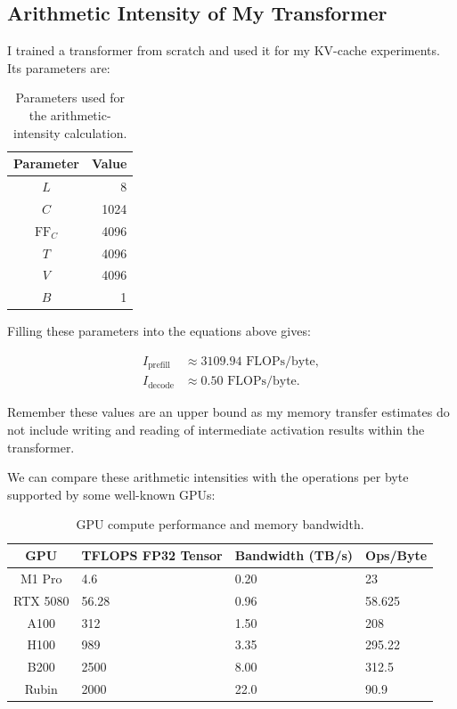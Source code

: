 \documentclass{article}
\begin{document}
\subsection{Arithmetic Intensity of My Transformer}

I trained a transformer from scratch and used it for my KV-cache experiments. Its parameters are:

\begin{table}[ht]
\centering
\begin{tabular}{|c|r|}
    \hline
    Parameter & Value \\
    \hline
    $L$ & 8 \\
    $C$ & 1024 \\
    $\mathrm{FF}_C$ & 4096 \\
    $T$ & 4096 \\
    $V$ & 4096 \\
    $B$ & 1 \\
    \hline
\end{tabular}
\caption{Parameters used for the arithmetic-intensity calculation.}
\label{tab:model-parameters}
\end{table}

Filling these parameters into the equations above gives:

\begin{align}
I_{\mathrm{prefill}} &\approx 3109.94 \text{ FLOPs/byte}, \\
I_{\mathrm{decode}}  &\approx 0.50 \text{ FLOPs/byte}.
\end{align}

Remember these values are an upper bound as my memory transfer estimates do not include writing and reading of intermediate activation results within the transformer.

We can compare these arithmetic intensities with the operations per byte supported by some well-known GPUs:

\begin{table}[ht]
\centering
\begin{tabular}{|c|l|l|l|}
   \hline
   GPU & TFLOPS FP32 Tensor & Bandwidth (TB/s) &
Ops/Byte \\
   \hline
   M1 Pro   & 4.6   & 0.20 & 23 \\
   RTX 5080 & 56.28 & 0.96 & 58.625 \\
   A100     & 312   & 1.50 & 208 \\
   H100     & 989   & 3.35 & 295.22 \\
   B200     & 2500  & 8.00 & 312.5 \\
   Rubin    & 2000  & 22.0 & 90.9 \\
   \hline
\end{tabular}
\caption{GPU compute performance and memory bandwidth.}
\label{tab:gpu-performance}
\end{table}
\end{document}
